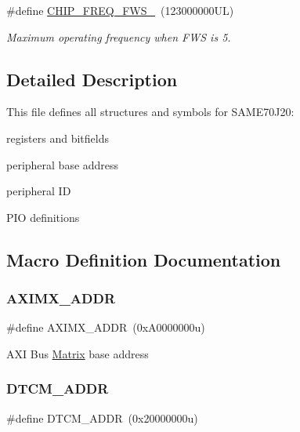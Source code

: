 \begin{DoxyCompactItemize}
\mbox{\label{group__SAME70J20__definitions_ga3b66824f858591135877b369f98d48a5}} 
\#define \mbox{\hyperlink{group__SAME70J20__definitions_ga3b66824f858591135877b369f98d48a5}{C\+H\+I\+P\+\_\+\+F\+R\+E\+Q\+\_\+\+F\+W\+S\+\_}}~(123000000\+U\+L)
\begin{DoxyCompactList}\small\item\em Maximum operating frequency when F\+WS is 5. \end{DoxyCompactList}\end{DoxyCompactItemize}


\subsection{Detailed Description}
This file defines all structures and symbols for S\+A\+M\+E70\+J20\+:
\begin{DoxyItemize}
\item registers and bitfields
\item peripheral base address
\item peripheral ID
\item P\+IO definitions 
\end{DoxyItemize}

\subsection{Macro Definition Documentation}
\mbox{\label{group__SAME70J20__definitions_ga2fb7cc681bf5e7fbce5e3635b72a330a}} 
\subsubsection{\texorpdfstring{AXIMX\_ADDR}{AXIMX\_ADDR}}
{\footnotesize\ttfamily \#define A\+X\+I\+M\+X\+\_\+\+A\+D\+DR~(0x\+A0000000u)}

A\+XI Bus \mbox{\hyperlink{structMatrix}{Matrix}} base address \mbox{\label{group__SAME70J20__definitions_ga26626a425f7ebb3a0c2dbc276f0d9f78}} 
\subsubsection{\texorpdfstring{DTCM\_ADDR}{DTCM\_ADDR}}
{\footnotesize\ttfamily \#define D\+T\+C\+M\+\_\+\+A\+D\+DR~(0x20000000u)}

